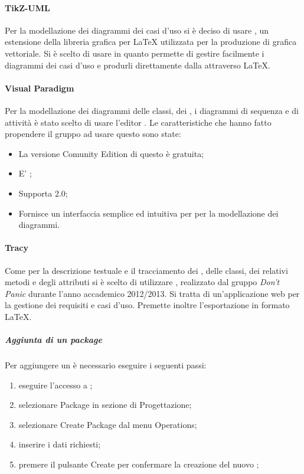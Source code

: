 \documentclass[12pt,a4paper]{article}
\begin{document}
\paragraph{TikZ-UML}\label{tikZ-UML}
Per la modellazione dei diagrammi dei casi d'uso si è deciso di usare , un estensione della libreria grafica   per \LaTeX{} utilizzata per la produzione di grafica vettoriale.
Si è scelto di usare  in quanto permette di gestire facilmente i diagrammi dei casi d'uso e produrli direttamente dalla attraverso \LaTeX{}.


\paragraph{Visual Paradigm}\label{visualParadigm}
Per la modellazione dei diagrammi delle classi, dei  , i diagrammi di sequenza e di attività è stato scelto di usare l'editor . Le caratteristiche che hanno fatto propendere il gruppo ad usare questo  sono state:
\begin{itemize}
	\item La versione Comunity Edition di questo  è gratuita;
	\item E' ;
	\item Supporta 2.0;
	\item Fornisce un interfaccia semplice ed intuitiva per per la modellazione dei diagrammi.
\end{itemize}

\paragraph{Tracy}\label{tracciamentoProgettazione}
Come  per la descrizione testuale e il tracciamento dei , delle classi, dei relativi metodi e degli attributi si è scelto di utilizzare , realizzato dal gruppo \textit{Don’t Panic} durante l’anno accademico 2012/2013. Si tratta di un’applicazione web per la gestione dei requisiti e casi d’uso. Premette inoltre l’esportazione in formato \LaTeX{}.

\subparagraph{Aggiunta di un package}

Per aggiungere un  è necessario eseguire i seguenti passi:
\begin{enumerate}
	\item eseguire l'accesso a ;
	\item selezionare Package in sezione di Progettazione; 
	\item selezionare Create Package dal menu Operations;
	\item inserire i dati richiesti;
	\item premere il pulsante Create per confermare la creazione del nuovo ;
\end{enumerate}
\end{document}

